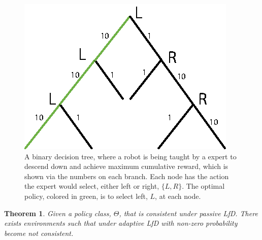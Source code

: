 \documentclass[10pt, conference]{ieeeconf}      %
\newtheorem{theorem}{Theorem}[section]
\begin{document}
\begin{figure}
\centering
\includegraphics{f_figs/counter_exmp.eps}
\caption{
    \footnotesize
A binary decision tree, where a robot is being taught by a expert to descend down and achieve maximum cumulative reward, which is shown via the numbers on each branch. Each node has the action the expert would select, either left or right, $\lbrace L, R \rbrace$. The optimal policy, colored in green, is to select left, $L$, at each node.}
\vspace*{-20pt}
\label{fig:c_ex}
\end{figure}


\begin{theorem}

Given a policy class, $\Theta$, that is consistent under passive LfD. There exists environments such that under adaptive LfD with non-zero probability become not consistent. \\

\end{theorem}
\end{document}
